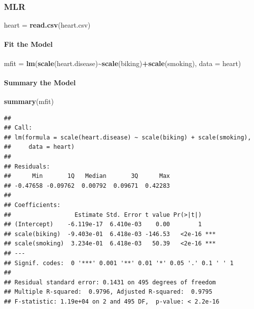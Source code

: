 \documentclass[
]{ctexart}
\newenvironment{Shaded}{\begin{snugshade}}{\end{snugshade}}
\newcommand{\AttributeTok}[1]{\textcolor[rgb]{0.13,0.29,0.53}{#1}}
\newcommand{\FunctionTok}[1]{\textcolor[rgb]{0.13,0.29,0.53}{\textbf{#1}}}
\newcommand{\NormalTok}[1]{#1}
\newcommand{\OtherTok}[1]{\textcolor[rgb]{0.56,0.35,0.01}{#1}}
\newcommand{\SpecialCharTok}[1]{\textcolor[rgb]{0.81,0.36,0.00}{\textbf{#1}}}
\newcommand{\StringTok}[1]{\textcolor[rgb]{0.31,0.60,0.02}{#1}}
\begin{document}
\hypertarget{mlr}{%
\subsubsection{MLR}\label{mlr}}

\begin{Shaded}
\begin{Highlighting}[]
\NormalTok{heart }\OtherTok{=} \FunctionTok{read.csv}\NormalTok{(}\StringTok{\textquotesingle{}heart.csv\textquotesingle{}}\NormalTok{)}
\end{Highlighting}
\end{Shaded}

\hypertarget{fit-the-model-4}{%
\paragraph{Fit the Model}\label{fit-the-model-4}}

\begin{Shaded}
\begin{Highlighting}[]
\NormalTok{mfit }\OtherTok{=} \FunctionTok{lm}\NormalTok{(}\FunctionTok{scale}\NormalTok{(heart.disease)}\SpecialCharTok{\textasciitilde{}}\FunctionTok{scale}\NormalTok{(biking)}\SpecialCharTok{+}\FunctionTok{scale}\NormalTok{(smoking),}
          \AttributeTok{data =}\NormalTok{ heart)}
\end{Highlighting}
\end{Shaded}

\hypertarget{summary-the-model-2}{%
\paragraph{Summary the Model}\label{summary-the-model-2}}

\begin{Shaded}
\begin{Highlighting}[]
\FunctionTok{summary}\NormalTok{(mfit)}
\end{Highlighting}
\end{Shaded}

\begin{verbatim}
## 
## Call:
## lm(formula = scale(heart.disease) ~ scale(biking) + scale(smoking), 
##     data = heart)
## 
## Residuals:
##      Min       1Q   Median       3Q      Max 
## -0.47658 -0.09762  0.00792  0.09671  0.42283 
## 
## Coefficients:
##                  Estimate Std. Error t value Pr(>|t|)    
## (Intercept)    -6.119e-17  6.410e-03    0.00        1    
## scale(biking)  -9.403e-01  6.418e-03 -146.53   <2e-16 ***
## scale(smoking)  3.234e-01  6.418e-03   50.39   <2e-16 ***
## ---
## Signif. codes:  0 '***' 0.001 '**' 0.01 '*' 0.05 '.' 0.1 ' ' 1
## 
## Residual standard error: 0.1431 on 495 degrees of freedom
## Multiple R-squared:  0.9796, Adjusted R-squared:  0.9795 
## F-statistic: 1.19e+04 on 2 and 495 DF,  p-value: < 2.2e-16
\end{verbatim}
\end{document}
